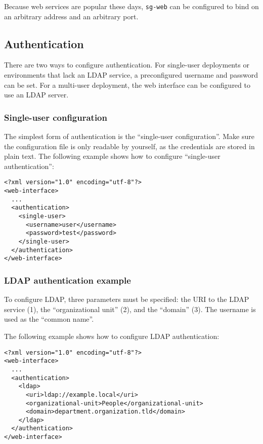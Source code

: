  Because web services are popular these days, \texttt{sg-web} can be configured
  to bind on an arbitrary address and an arbitrary port.

\subsection{Authentication}
\label{sec:authentication}

  There are two ways to configure authentication.  For single-user deployments
  or environments that lack an LDAP service, a preconfigured username and
  password can be set.  For a multi-user deployment, the web interface can be
  configured to use an LDAP server.

\subsubsection{Single-user configuration}

  The simplest form of authentication is the ``single-user configuration''.
  Make sure the configuration file is only readable by yourself, as the
  credentials are stored in plain text.  The following example shows how
  to configure ``single-user authentication'':

\begin{siderules}
\begin{verbatim}
<?xml version="1.0" encoding="utf-8"?>
<web-interface>
  ...
  <authentication>
    <single-user>
      <username>user</username>
      <password>test</password>
    </single-user>
  </authentication>
</web-interface>
\end{verbatim}
\end{siderules}

\subsubsection{LDAP authentication example}

  To configure LDAP, three parameters must be specified: the URI to the LDAP
  service (1), the ``organizational unit'' (2), and the ``domain'' (3).  The
  username is used as the ``common name''.

  The following example shows how to configure LDAP authentication:

\begin{siderules}
\begin{verbatim}
<?xml version="1.0" encoding="utf-8"?>
<web-interface>
  ...
  <authentication>
    <ldap>
      <uri>ldap://example.local</uri>
      <organizational-unit>People</organizational-unit>
      <domain>department.organization.tld</domain>
    </ldap>
  </authentication>
</web-interface>
\end{verbatim}
\end{siderules}

